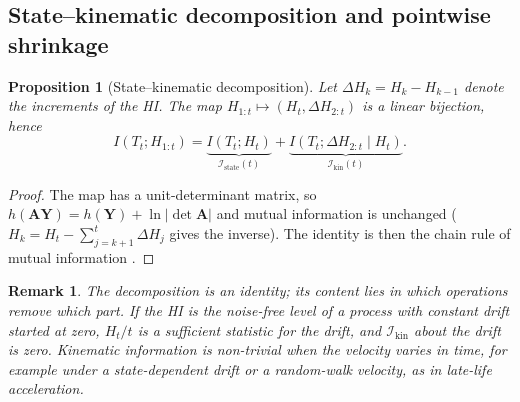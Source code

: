 \documentclass[preprint,12pt]{elsarticle}
\newtheorem{proposition}{Proposition}
\newtheorem{remark}{Remark}
\theoremstyle{definition}
\newcommand{\Istate}{\mathcal{I}_{\mathrm{state}}}
\newcommand{\Ikin}{\mathcal{I}_{\mathrm{kin}}}
\begin{document}
\subsection{State--kinematic decomposition and pointwise shrinkage}
\begin{proposition}[State--kinematic decomposition]
\label{prop:decomp}
Let $\Delta H_k=H_k-H_{k-1}$ denote the increments of the HI. The map $H_{1:t}\mapsto (H_t,\Delta H_{2:t})$ is a linear bijection, hence
\begin{equation}
I(T_t;H_{1:t})=\underbrace{I(T_t;H_t)}_{\Istate(t)}+\underbrace{I(T_t;\Delta H_{2:t}\mid H_t)}_{\Ikin(t)} .
\end{equation}
\end{proposition}
\begin{proof}
The map has a unit-determinant matrix, so $h(\mathbf A\mathbf Y)=h(\mathbf Y)+\ln|\det\mathbf A|$ \cite[Sect.~8.6]{cover2006} and mutual information is unchanged ($H_k=H_t-\sum_{j=k+1}^{t}\Delta H_j$ gives the inverse). The identity is then the chain rule of mutual information \cite[Sect.~2.5]{cover2006}.
\end{proof}
\begin{remark}
The decomposition is an identity; its content lies in which operations remove which part. If the HI is the noise-free level of a process with constant drift started at zero, $H_t/t$ is a sufficient statistic for the drift, and $\Ikin$ about the drift is zero. Kinematic information is non-trivial when the velocity varies in time, for example under a state-dependent drift or a random-walk velocity, as in late-life acceleration.
\end{remark}
\end{document}
